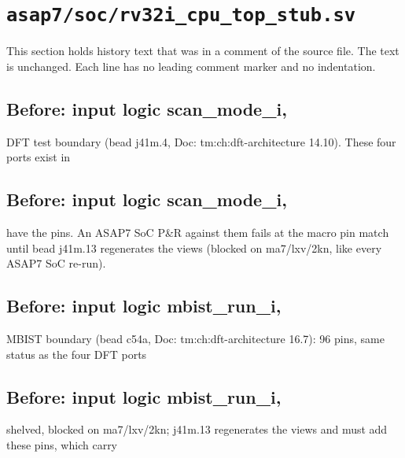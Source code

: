 \section{\texttt{asap7/soc/rv32i\_cpu\_top\_stub.sv}}\label{cr:pd:asap7-soc-rv32i-cpu-top-stub-sv}

This section holds history text that was in a comment of the source file. The text is unchanged. Each line has no leading comment marker and no indentation.

\begin{record}

\subsection*{Before: input  logic        scan\_mode\_i,}

\begin{textblock}
DFT test boundary (bead j41m.4, Doc: tm:ch:dft-architecture 14.10). These four ports exist in
\end{textblock}

\subsection*{Before: input  logic        scan\_mode\_i,}

\begin{textblock}
have the pins. An ASAP7 SoC P&R against them fails at the macro pin match until bead
j41m.13 regenerates the views (blocked on ma7/lxv/2kn, like every ASAP7 SoC re-run).
\end{textblock}

\subsection*{Before: input  logic        mbist\_run\_i,}

\begin{textblock}
MBIST boundary (bead c54a, Doc: tm:ch:dft-architecture 16.7): 96 pins, same status as the four DFT ports
\end{textblock}

\subsection*{Before: input  logic        mbist\_run\_i,}

\begin{textblock}
shelved, blocked on ma7/lxv/2kn; j41m.13 regenerates the views and must add these pins, which carry
\end{textblock}

\end{record}

